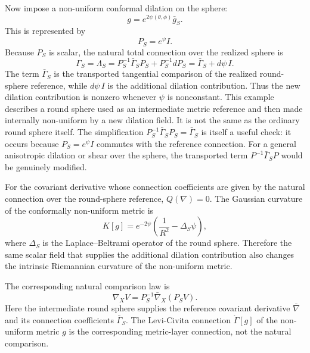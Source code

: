 \documentclass[12pt]{amsart}
\theoremstyle{definition}
\theoremstyle{remark}
\begin{document}
Now impose a non-uniform conformal dilation on the sphere:
\begin{equation}\label{eq:nonuniform_sphere_metric_v2_revised}
 g=e^{2\psi(\theta,\phi)}\bar g_S .
\end{equation}
This is represented by
\begin{equation}\label{eq:nonuniform_sphere_P_Lambda_v2_revised}
 P_S=e^{\psi}I .
\end{equation}
Because \(P_S\) is scalar, the natural total connection over the realized sphere is
\begin{equation}\label{eq:nonuniform_sphere_total_connection_v2_revised}
 \Gamma_S=\Lambda_S=P_S^{-1}\bar\Gamma_S P_S+P_S^{-1}dP_S
 =\bar\Gamma_S+d\psi\,I .
\end{equation}
The term \(\bar\Gamma_S\) is the transported tangential comparison of the realized round-sphere reference, while \(d\psi\,I\) is the additional dilation contribution.  Thus the new dilation contribution is nonzero whenever \(\psi\) is nonconstant.  This example describes a round sphere used as an intermediate metric reference and then made internally non-uniform by a new dilation field.  It is not the same as the ordinary round sphere itself.  The simplification \(P_S^{-1}\bar\Gamma_SP_S=\bar\Gamma_S\) is itself a useful check: it occurs because \(P_S=e^\psi I\) commutes with the reference connection.  For a general anisotropic dilation or shear over the sphere, the transported term \(P^{-1}\bar\Gamma_SP\) would be genuinely modified.

For the covariant derivative whose connection coefficients are given by the natural connection over the round-sphere reference, \(Q(\nabla)=0\).  The Gaussian curvature of the conformally non-uniform metric is
\begin{equation}\label{eq:nonuniform_sphere_K_v2_revised}
 K[g]=e^{-2\psi}\left(\frac1{R^2}-\Delta_S\psi\right),
\end{equation}
where \(\Delta_S\) is the Laplace--Beltrami operator of the round sphere.  Therefore the same scalar field that supplies the additional dilation contribution also changes the intrinsic Riemannian curvature of the non-uniform metric.

The corresponding natural comparison law is
\[
 \nabla_XV=P_S^{-1}\bar\nabla_X(P_SV).
\]
Here the intermediate round sphere supplies the reference covariant derivative \(\bar\nabla\) and its connection coefficients \(\bar\Gamma_S\).  The Levi-Civita connection \(\mathring\Gamma[g]\) of the non-uniform metric \(g\) is the corresponding metric-layer connection, not the natural comparison.
\end{document}
